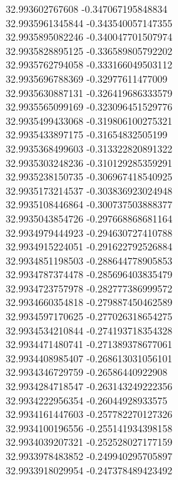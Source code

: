 {32.993602767608	-0.347067195848834\\
32.9935961345844	-0.343540057147355\\
32.9935895082246	-0.340047701507974\\
32.9935828895125	-0.336589805792202\\
32.9935762794058	-0.333166049503112\\
32.9935696788369	-0.32977611477009\\
32.9935630887131	-0.326419686333579\\
32.9935565099169	-0.323096451529776\\
32.9935499433068	-0.319806100275321\\
32.9935433897175	-0.31654832505199\\
32.9935368499603	-0.313322820891322\\
32.9935303248236	-0.310129285359291\\
32.9935238150735	-0.306967418540925\\
32.9935173214537	-0.303836923024948\\
32.9935108446864	-0.300737503888377\\
32.9935043854726	-0.297668868681164\\
32.9934979444923	-0.294630727410788\\
32.9934915224051	-0.291622792526884\\
32.9934851198503	-0.288644778905853\\
32.9934787374478	-0.285696403835479\\
32.9934723757978	-0.282777386999572\\
32.9934660354818	-0.279887450462589\\
32.9934597170625	-0.277026318654275\\
32.9934534210844	-0.274193718354328\\
32.9934471480741	-0.271389378677061\\
32.9934408985407	-0.268613031056101\\
32.9934346729759	-0.26586440922908\\
32.9934284718547	-0.263143249222356\\
32.9934222956354	-0.26044928933575\\
32.9934161447603	-0.257782270127326\\
32.9934100196556	-0.255141934398158\\
32.9934039207321	-0.252528027177159\\
32.9933978483852	-0.249940295705897\\
32.9933918029954	-0.247378489423492\\
}
